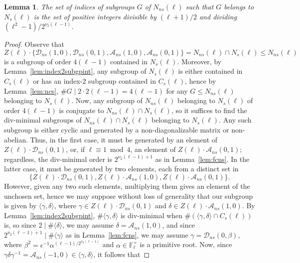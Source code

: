 \documentclass[table,dvipsnames]{amsart}
\newcommand{\F}{\mathbb{F}}
\newcommand{\angles}[1]{\langle #1\rangle}
\newtheorem{lemma}[theorem]{Lemma}
\numberwithin{equation}{section}
\newcommand{\s}{\textit{s}}
\newcommand{\ns}{\textit{ns}}
\newcommand{\Cs}{C_\s}
\newcommand{\Ns}{N_\s}
\newcommand{\Nns}{N_\ns}
\begin{document}
\begin{lemma}
\label{lem:nns}
The set of indices of subgroups $G$ of $\Nns(\ell)$ such that $G$ belongs to $\Ns(\ell)$ is the set of positive integers divisible by $(\ell+1)/2$ and dividing \((\ell^2-1)/2^{\nu_2(\ell-1)}\).
\end{lemma}
\begin{proof}
Observe that
\begin{equation*}
Z(\ell)\cdot\{\mathcal{D}_\ns(1,0),\mathcal{D}_\ns(0,1),\mathcal{A}_\ns(1,0),\mathcal{A}_\ns(0,1)\}=\Nns(\ell)\cap\Ns(\ell)\le\Nns(\ell)
\end{equation*}
is a subgroup of order $4(\ell-1)$ contained in $\Ns(\ell)$. Moreover, by Lemma~\ref{lem:index2subgpint}, any subgroup of $\Ns(\ell)$ is either contained in $\Cs(\ell)$ or has an index-$2$ subgroup contained in $\Cs(\ell)$, hence by Lemma~\ref{lem:ncs}, $\#G\mid 2\cdot 2(\ell-1)=4(\ell-1)$ for any $G\le\Nns(\ell)$ belonging to $\Ns(\ell)$. Now, any subgroup of $\Nns(\ell)$ belonging to $\Ns(\ell)$ of order $4(\ell-1)$ is conjugate to $\Nns(\ell)\cap\Ns(\ell)$, so it suffices to find the div-minimal subgroups of $\Nns(\ell)\cap\Ns(\ell)$ belonging to $\Ns(\ell)$. Any such subgroup is either cyclic and generated by a non-diagonalizable matrix or non-abelian. Thus, in the first case, it must be generated by an element of $Z(\ell)\cdot\mathcal{D}_\ns(0,1)$, or, if $\ell\equiv 1\bmod 4$, an element of $Z(\ell)\cdot\mathcal{A}_\ns(0,1)$; regardless, the div-minimal order is $2^{\nu_2(\ell-1)+1}$ as in Lemma~\ref{lem:fcns}. In the latter case, it must be generated by two elements, each from a distinct set in
\begin{equation*}
\{Z(\ell)\cdot\mathcal{D}_\ns(0,1),Z(\ell)\cdot\mathcal{A}_\ns(1,0),Z(\ell)\cdot\mathcal{A}_\ns(0,1)\}.
\end{equation*}
However, given any two such elements, multiplying them gives an element of the unchosen set, hence we may suppose without loss of generality that our subgroup is given by $\angles{\gamma,\delta}$, where $\gamma\in Z(\ell)\cdot\mathcal{D}_\ns(0,1)$ and $\delta\in Z(\ell)\cdot\mathcal{A}_\ns(1,0)$. By Lemma~\ref{lem:index2subgpint}, $\#\angles{\gamma,\delta}$ is div-minimal when $\#(\angles{\gamma,\delta}\cap\Cs(\ell))$ is, so since $2\mid\#\angles{\delta}$, we may assume $\delta=\mathcal{A}_\ns(1,0)$, and since $2^{\nu_2(\ell-1)+1}\mid\#\angles{\gamma}$ as in Lemma~\ref{lem:fcns}, we may assume $\gamma=\mathcal{D}_\ns(0,\beta)$, where $\beta^2=\epsilon^{-1}\alpha^{(\ell-1)/2^{\nu_2(\ell-1)}}$ and $\alpha\in\F_\ell^\times$ is a primitive root. Now, since $\gamma\delta\gamma^{-1}=\mathcal{A}_\ns(-1,0)\in\angles{\gamma,\delta}$, it follows that

\end{proof}
\end{document}
